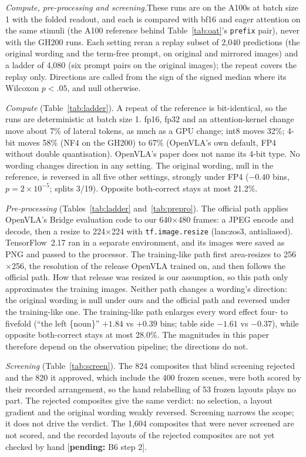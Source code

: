 \documentclass[conference]{IEEEtran}
\newcommand{\pending}[1]{\textcolor{orange!85!black}{[\textbf{pending:} #1]}}
\newcommand{\rowid}[1]{\texttt{#1}}
\newcommand{\head}[1]{\textit{#1}\hspace{0.4em}}
\begin{document}
\head{Compute, pre-processing and screening.}These runs are on the A100s at batch size 1 with the folded readout, and each is compared with bf16 and eager attention on the same stimuli (the A100 reference behind Table~\ref{tab:oat}'s \rowid{prefix} pair), never with the GH200 runs. Each setting reran a replay subset of 2,040 predictions (the original wording and the term-free prompt, on original and mirrored images) and a ladder of 4,080 (six prompt pairs on the original images); the repeat covers the replay only. Directions are called from the sign of the signed median where its Wilcoxon $p<.05$, and null otherwise.

\emph{Compute} (Table~\ref{tab:ladder}). A repeat of the reference is bit-identical, so the runs are deterministic at batch size 1. fp16, fp32 and an attention-kernel change move about 7\% of lateral tokens, as much as a GPU change; int8 moves 32\%; 4-bit moves 58\% (NF4 on the GH200) to 67\% (OpenVLA's own default, FP4 without double quantisation). OpenVLA's paper does not name its 4-bit type. No wording changes direction in any setting. The original wording, null in the reference, is reversed in all five other settings, strongly under FP4 ($-0.40$ bins, $p=2\times10^{-5}$; splits 3/19). Opposite both-correct stays at most 21.2\%.

\emph{Pre-processing} (Tables~\ref{tab:ladder} and~\ref{tab:prepro}). The official path applies OpenVLA's Bridge evaluation code to our 640$\times$480 frames: a JPEG encode and decode, then a resize to 224$\times$224 with \texttt{tf.image.resize} (lanczos3, antialiased). TensorFlow~2.17 ran in a separate environment, and its images were saved as PNG and passed to the processor. The training-like path first area-resizes to 256$\times$256, the resolution of the release OpenVLA trained on, and then follows the official path. How that release was resized is our assumption, so this path only approximates the training images. Neither path changes a wording's direction: the original wording is null under ours and the official path and reversed under the training-like one. The training-like path enlarges every word effect four- to fivefold (``the left \{noun\}'' $+1.84$ vs $+0.39$ bins; table side $-1.61$ vs $-0.37$), while opposite both-correct stays at most 28.0\%. The magnitudes in this paper therefore depend on the observation pipeline; the directions do not.

\emph{Screening} (Table~\ref{tab:screen}). The 824 composites that blind screening rejected and the 820 it approved, which include the 400 frozen scenes, were both scored by their recorded arrangement, so the hand relabelling of 53 frozen layouts plays no part. The rejected composites give the same verdict: no selection, a layout gradient and the original wording weakly reversed. Screening narrows the scope; it does not drive the verdict. The 1,604 composites that were never screened are not scored, and the recorded layouts of the rejected composites are not yet checked by hand \pending{B6 step 2}.
\end{document}
